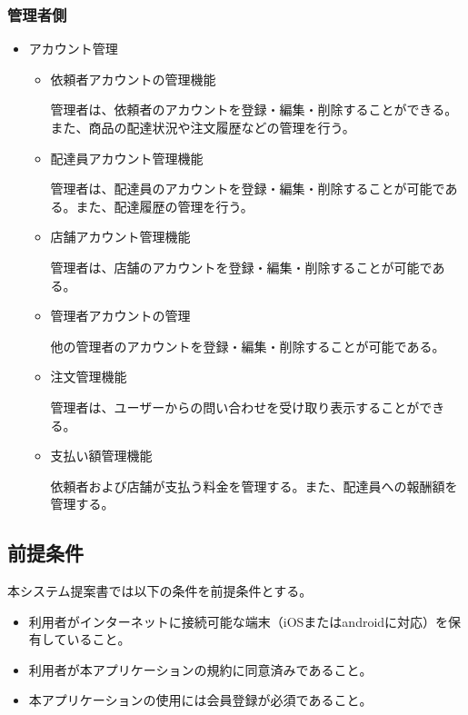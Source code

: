 \subsubsection{管理者側}

\begin{itemize}
  \item アカウント管理
    \begin{itemize}
        \item 依頼者アカウントの管理機能
        
        管理者は、依頼者のアカウントを登録・編集・削除することができる。また、商品の配達状況や注文履歴などの管理を行う。


        \item 配達員アカウント管理機能
        
        管理者は、配達員のアカウントを登録・編集・削除することが可能である。また、配達履歴の管理を行う。

        \item 店舗アカウント管理機能

        管理者は、店舗のアカウントを登録・編集・削除することが可能である。
        
        \item 管理者アカウントの管理

        他の管理者のアカウントを登録・編集・削除することが可能である。
        
        \item 注文管理機能
        
        管理者は、ユーザーからの問い合わせを受け取り表示することができる。

        \item 支払い額管理機能

        依頼者および店舗が支払う料金を管理する。また、配達員への報酬額を管理する。


    \end{itemize}
  
\end{itemize}

\subsection{前提条件}
 本システム提案書では以下の条件を前提条件とする。

 \begin{itemize}
  \item 利用者がインターネットに接続可能な端末（iOSまたはandroidに対応）を保有していること。
  \item 利用者が本アプリケーションの規約に同意済みであること。
  \item 本アプリケーションの使用には会員登録が必須であること。
\end{itemize}

